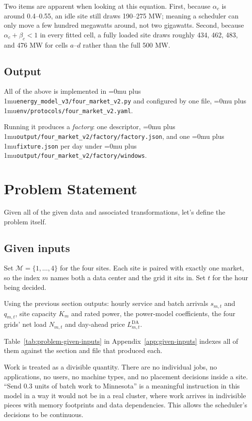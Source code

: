 \documentclass[conference]{IEEEtran}
\newcommand{\codepath}[1]{{\Urlmuskip=0mu plus 1mu\relax\nolinkurl{#1}}}
\begin{document}
Two items are apparent when looking at this equation. First, because \(\alpha_c\) is around 0.4--0.55, an idle site still draws 190--275 MW; meaning a scheduler can only move a few hundred megawatts around, not two gigawatts. Second, because \(\alpha_c+\beta_c<1\) in every fitted cell, a fully loaded site draws roughly 434, 462, 483, and 476 MW for cells \(a\)--\(d\) rather than the full 500 MW.

\subsection{Output}
\label{subsec:Output-factory}

All of the above is implemented in \codepath{energy_model_v3/four_market_v2.py} and configured by one file, \codepath{env/protocols/four_market_v2.yaml}. 

Running it produces a \emph{factory}: one descriptor, \codepath{output/four_market_v2/factory/factory.json}, and one \codepath{fixture.json} per day under \codepath{output/four_market_v2/factory/windows}. 


\section{Problem Statement}
\label{sec:problem-statement}

Given all of the given data and associated transformations, let's define the problem itself.

\subsection{Given inputs}
\label{subsec:problem-given-inputs}

Set \(\mathcal{M}=\{1,\ldots,4\}\) for the four sites. Each site is paired
with exactly one market, so the index \(m\) names both a data center and the
grid it sits in. Set \(t\) for the hour being decided.

Using the previous section outputs: hourly service and batch arrivals \(s_{m,t}\) and \(q_{m,t}\), site capacity \(K_m\) and rated power, the power-model coefficients, the four grids' net load \(N_{m,t}\) and day-ahead price \(L^{\mathrm{DA}}_{m,t}\).

Table~\ref{tab:problem-given-inputs} in Appendix~\ref{app:given-inputs} indexes all of them against the section and file that produced each.

Work is treated as a divisible quantity. There are no individual jobs, no applications, no users, no machine types, and no placement decisions inside a site. ``Send 0.3 units of batch work to Minnesota'' is a meaningful instruction in this model in a way it would not be in a real cluster, where work arrives in indivisible pieces with memory footprints and data dependencies. This allows  the scheduler's decisions to be continuous.
\end{document}
